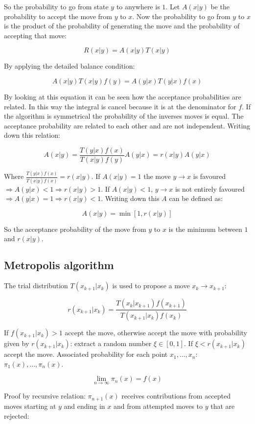 	So the probability to go from state $y$ to anywhere is $1$.
	Let $A(x|y)$ be the probability to accept the move from $y$ to $x$.
	Now the probability to go from $y$ to $x$ is the product of the probability of generating the move and the probability of accepting that move:

	$$R(x|y) = A(x|y)T(x|y)$$

	By applying the detailed balance condition:

	$$A(x|y)T(x|y)f(y) = A(y|x)T(y|x)f(x)$$

	By looking at this equation it can be seen how the acceptance probabilities are related.
	In this way the integral is cancel because it is at the denominator for $f$.
	If the algorithm is symmetrical the probability of the inverses moves is equal.
	The acceptance probability are related to each other and are not independent.
	Writing down this relation:

	$$A(x|y) = \frac{T(y|x)f(x)}{T(x|y)f(y)}A(y|x) = r(x|y)A(y|x)$$

	Where $\frac{T(y|x)f(x)}{T(x|y)f(x)} = r(x|y)$.
	If $A(x|y) = 1$ the move $y\rightarrow x$ is favoured $\Rightarrow A(y|x)< 1 \Rightarrow r(x|y)>1$.
	If $A(x|y) < 1$, $y\rightarrow x$ is not entirely favoured $\Rightarrow A(y|x) = 1\Rightarrow r(x|y) < 1$.
	Writing down this $A$ can be defined as:

	$$A(x|y) = \min[1, r(x|y)]$$

	So the acceptance probability of the move from $y$ to $x$ is the minimum between $1$ and $r(x|y)$.

	\subsection{Metropolis algorithm}
	The trial distribution $T(x_{k+1}|x_k)$ is used to propose a move $x_k\rightarrow x_{k+1}$:

	$$r(x_{k+1}|x_k) = \frac{T(x_k|x_{k+1})f(x_{k+1})}{T(x_{k+1}|x_k)f(x_k)}$$

	If $f(x_{k+1}|x_k)>1$ accept the move, otherwise accept the move with probability given by $r(x_{k+1}|x_k)$: extract a random number $\xi\in[0,1]$.
	If $\xi< r(x_{k+1}|x_k)$ accept the move.
	Associated probability for each point $x_1, \dots, x_n$: $\pi_1(x), \dots, \pi_n(x)$.

	$$\lim\limits_{n\rightarrow\infty}\pi_n(x) = f(x)$$

	Proof by recursive relation: $\pi_{n+1}(x)$ receives contributions from accepted moves starting at $y$ and ending in $x$ and from attempted moves to $y$ that are rejected:

